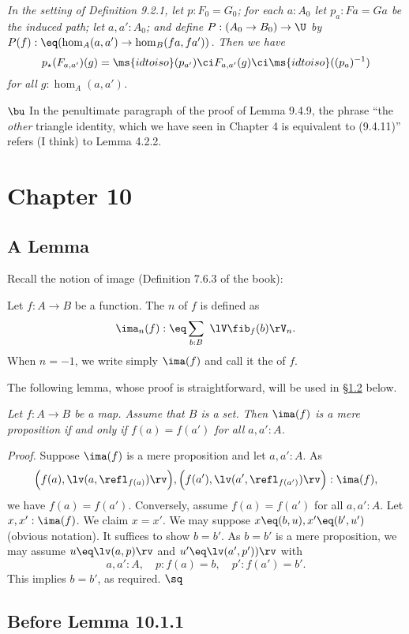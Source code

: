\documentclass[12pt]{article}
\begin{document}
\emph{In the setting of Definition 9.2.1, let $p:F_0=G_0$; for each $a:A_0$ let $p_a:Fa=Ga$ be the induced path; let $a,a':A_0$; and define $P:(A_0\to B_0)\to\U$ by $P(f):\eq(\hom_A(a,a')\to\hom_B(fa,fa'))$. Then we have} 
$$
p_\star(F_{a,a'})(g)=\ms{idtoiso}(p_{a'})\ci F_{a,a'}(g)\ci\ms{idtoiso}((p_a)^{-1})
$$ 
\emph{for all $g:\hom_A(a,a')$.}

\nn$\bu$ In the penultimate paragraph of the proof of Lemma 9.4.9, the phrase ``the \emph{other} triangle identity, which we have seen in Chapter 4 is equivalent to (9.4.11)'' refers (I think) to Lemma 4.2.2.


\section{Chapter 10}

\subsection{A Lemma}\label{imfmp}

Recall the notion of image (Definition 7.6.3 of the book):

\nn{} Let $f:A\to B$ be a function. The $n$ of $f$ is defined as
$$
\ima_n(f):\eq\sum_{b:B}\ \lV\fib_f(b)\rV_n.
$$ 
When $n=-1$, we write simply $\ima(f)$ and call it the  of $f$.

The following lemma, whose proof is straightforward, will be used in \S\ref{1011} below.

\nn{} \emph{Let $f:A\to B$ be a map. Assume that $B$ is a set. Then $\ima(f)$ is a mere proposition if and only if $f(a)=f(a')$ for all $a,a':A$.}

\nn\emph{Proof.} Suppose $\ima(f)$ is a mere proposition and let $a,a':A$. As 
$$
\Big(f(a),\lv(a,\refl_{f(a)})\rv\Big),\Big(f(a'),\lv(a',\refl_{f(a')})\rv\Big):\ima(f),
$$ 
we have $f(a)=f(a')$. Conversely, assume $f(a)=f(a')$ for all $a,a':A$. Let $x,x':\ima(f)$. We claim $x=x'$. We may suppose $x\eq(b,u),x'\eq(b',u')$ (obvious notation). It suffices to show $b=b'$. As $b=b'$ is a mere proposition, we may assume $u\eq\lv(a,p)\rv$ and $u'\eq\lv(a',p'))\rv$ with 
$$
a,a':A,\quad p:f(a)=b,\quad p':f(a')=b'.
$$ 
This implies $b=b'$, as required. $\sq$


\subsection{Before Lemma 10.1.1}\label{1011}
\end{document}
